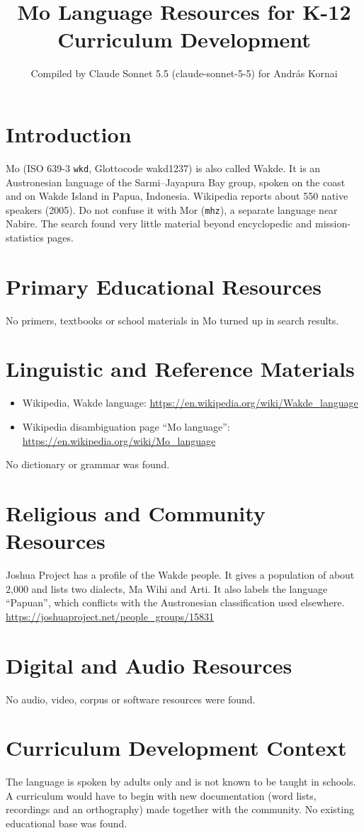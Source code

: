 \documentclass[12pt]{article}
\title{Mo Language Resources for K-12 Curriculum Development}
\author{Compiled by Claude Sonnet 5.5 (claude-sonnet-5-5) for Andr\'as Kornai}
\date{}
\begin{document}
\maketitle

\section{Introduction}
Mo (ISO 639-3 \texttt{wkd}, Glottocode wakd1237) is also called Wakde. It is an Austronesian language of the Sarmi--Jayapura Bay group, spoken on the coast and on Wakde Island in Papua, Indonesia. Wikipedia reports about 550 native speakers (2005). Do not confuse it with Mor (\texttt{mhz}), a separate language near Nabire. The search found very little material beyond encyclopedic and mission-statistics pages.

\section{Primary Educational Resources}
No primers, textbooks or school materials in Mo turned up in search results.

\section{Linguistic and Reference Materials}
\begin{itemize}
\item Wikipedia, Wakde language: \url{https://en.wikipedia.org/wiki/Wakde_language}
\item Wikipedia disambiguation page ``Mo language'': \url{https://en.wikipedia.org/wiki/Mo_language}
\end{itemize}
No dictionary or grammar was found.

\section{Religious and Community Resources}
Joshua Project has a profile of the Wakde people. It gives a population of about 2,000 and lists two dialects, Ma Wihi and Arti. It also labels the language ``Papuan'', which conflicts with the Austronesian classification used elsewhere. \url{https://joshuaproject.net/people_groups/15831}

\section{Digital and Audio Resources}
No audio, video, corpus or software resources were found.

\section{Curriculum Development Context}
The language is spoken by adults only and is not known to be taught in schools. A curriculum would have to begin with new documentation (word lists, recordings and an orthography) made together with the community. No existing educational base was found.
\end{document}
